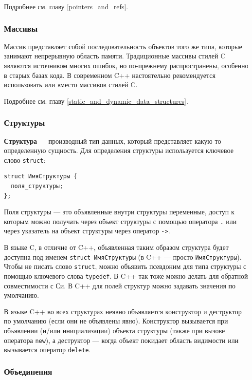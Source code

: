 Подробнее см. главу \ref{pointers_and_refs}.

\subsubsection{Массивы}

Массив представляет собой последовательность объектов того же типа, которые занимают непрерывную область памяти. Традиционные массивы стилей C являются источником многих ошибок, но по-прежнему распространены, особенно в старых базах кода. В современном C++ настоятельно рекомендуется использовать  или  вместо массивов стилей C.

Подробнее см. главу \ref{static_and_dynamic_data_structures}.

\subsubsection{Структуры}

\textbf{Структура} \label{def:struct} --- производный тип данных, который представляет какую-то определенную сущность.
Для определения структуры используется ключевое слово \verb|struct|:
\begin{verbatim}
struct ИмяСтруктуры {
  поля_структуры;
};
\end{verbatim}
Поля структуры --- это объявленные внутри структуры переменные, доступ к которым можно получать через объект структуры
с помощью оператора \verb|.| или через указатель на объект структуры через оператор \verb|->|.

В языке C, в отличие от C++, объявленная таким образом структура будет доступна под именем
\verb|struct ИмяСтруктуры| (в C++ --- просто \verb|ИмяСтруктуры|). Чтобы не писать слово
\verb|struct|, можно объявить псевдоним для типа структуры с помощью ключевого слова
\verb|typedef|. В C++ так тоже можно делать для обратной совместимости с Си. В C++
для полей структур можно задавать значения по умолчанию.

{\small В языке C++ во всех структурах неявно объявляется конструктор и деструктор по умолчанию
(если они не объявлены явно). Конструктор вызывается при объявлении (и/или инициализации) объекта
структуры (также при вызове оператора \verb|new|), а деструктор --- когда объект покидает
область видимости или вызывается оператор \verb|delete|.}

\subsubsection{Объединения}

